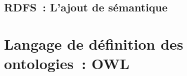 \subsection{RDFS~: L'ajout de sémantique}
\label{sec:semantic-web-rdfs}

\section{Langage de définition des ontologies~: OWL}
\label{sec:semantic-web-owl}








